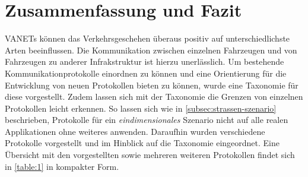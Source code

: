 \documentclass[english,runningheads,a4paper]{llncs}[2018/03/10]
\begin{document}
\section{Zusammenfassung und Fazit}
\label{sec:conclusion}
VANETs können das Verkehrsgeschehen überaus positiv auf unterschiedlichste Arten beeinflussen.
Die Kommunikation zwischen einzelnen Fahrzeugen und von Fahrzeugen zu anderer Infrakstruktur ist hierzu unerlässlich.
Um bestehende Kommunikationprotokolle einordnen zu können und eine Orientierung für die Entwicklung von neuen Protokollen bieten zu können, wurde eine Taxonomie für diese vorgestellt.
Zudem lassen sich mit der Taxonomie die Grenzen von einzelnen Protokollen leicht erkennen.
So lassen sich wie in \ref{subsec:strassen-szenario} beschrieben, Protokolle für ein \textit{eindimensionales} Szenario nicht auf alle realen Applikationen ohne weiteres anwenden.
Daraufhin wurden verschiedene Protokolle vorgestellt und im Hinblick auf die Taxonomie eingeordnet.
Eine Übersicht mit den vorgestellten sowie mehreren weiteren Protokollen findet sich in \ref{table:1} in kompakter Form\cite{conti2013mobile}.
\end{document}
